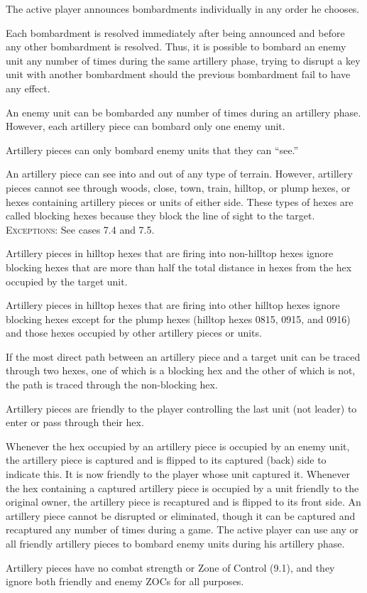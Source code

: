  The active player announces bombardments individually in any order he chooses.

Each bombardment is resolved immediately after being announced and before any other bombardment is resolved. Thus, it is possible to bombard an enemy unit any number of times during the same artillery phase, trying to disrupt a key unit with another bombardment should the previous bombardment fail to have any effect.

 An enemy unit can be bombarded any number of times during an artillery phase. However, each artillery piece can bombard only one enemy unit.

 Artillery pieces can only bombard enemy units that they can ``see.''

An artillery piece can see into and out of any type of terrain. However, artillery pieces cannot see through woods, close, town, train, hilltop, or plump hexes, or hexes containing artillery pieces or units of either side. These types of hexes are called blocking hexes because they block the line of sight to the target. \textsc{Exceptions:} See cases 7.4 and 7.5.

 Artillery pieces in hilltop hexes that are firing into non-hilltop hexes ignore blocking hexes that are more than half the total distance in hexes from the hex occupied by the target unit.

 Artillery pieces in hilltop hexes that are firing into other hilltop hexes ignore blocking hexes except for the plump hexes (hilltop hexes 0815, 0915, and 0916) and those hexes occupied by other artillery pieces or units.

 If the most direct path between an artillery piece and a target unit can be traced through two hexes, one of which is a blocking hex and the other of which is not, the path is traced through the non-blocking hex.

 Artillery pieces are friendly to the player controlling the last unit (not leader) to enter or pass through their hex.

Whenever the hex occupied by an artillery piece is occupied by an enemy unit, the artillery piece is captured and is flipped to its captured (back) side to indicate this. It is now friendly to the player whose unit captured it. Whenever the hex containing a captured artillery piece is occupied by a unit friendly to the original owner, the artillery piece is recaptured and is flipped to its front side. An artillery piece cannot be disrupted or eliminated, though it can be captured and recaptured any number of times during a game. The active player can use any or all friendly artillery pieces to bombard enemy units during his artillery phase.

 Artillery pieces have no combat strength or Zone of Control (9.1), and they ignore both friendly and enemy ZOCs for all purposes.
